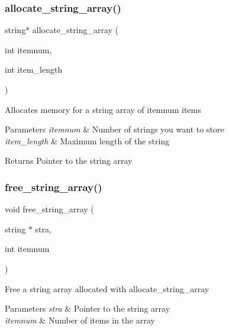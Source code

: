 \subsubsection{\texorpdfstring{allocate\+\_\+string\+\_\+array()}{allocate\_string\_array()}}
{\footnotesize\ttfamily string$\ast$ allocate\+\_\+string\+\_\+array (\begin{DoxyParamCaption}\item[{int}]{itemnum,  }\item[{int}]{item\+\_\+length }\end{DoxyParamCaption})}

Allocates memory for a string array of {\ttfamily itemnum} items 
\begin{DoxyParams}{Parameters}
{\em itemnum} & Number of strings you want to store \\
\hline
{\em item\+\_\+length} & Maximum length of the string \\
\hline
\end{DoxyParams}
\begin{DoxyReturn}{Returns}
Pointer to the string array 
\end{DoxyReturn}
\mbox{\label{string-utils_8h_a918fe39c23de1b58fb8d3cd4749455e3}} 
\subsubsection{\texorpdfstring{free\+\_\+string\+\_\+array()}{free\_string\_array()}}
{\footnotesize\ttfamily void free\+\_\+string\+\_\+array (\begin{DoxyParamCaption}\item[{string $\ast$}]{stra,  }\item[{int}]{itemnum }\end{DoxyParamCaption})}

Free a string array allocated with allocate\+\_\+string\+\_\+array 
\begin{DoxyParams}{Parameters}
{\em stra} & Pointer to the string array \\
\hline
{\em itemnum} & Number of items in the array \\
\hline
\end{DoxyParams}
\mbox{\label{string-utils_8h_aebd1ff6ce580eecc97a5953c21bda0c4}} 
